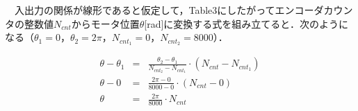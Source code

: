 　入出力の関係が線形であると仮定して，Table3にしたがってエンコーダカウンタの整数値$N_{cnt}$からモータ位置$\theta$[rad]に変換する式を組み立てると．次のようになる（$\theta_1 = 0$，$\theta_2 = 2\pi$，$N_{cnt_1} = 0$，$N_{cnt_2} = 8000$）．

\begin{eqnarray}
    \theta - \theta_1 &=& \frac{\theta_2 - \theta_1}{N_{cnt_2} - N_{cnt_1}} \cdot \left(N_{cnt} - N_{cnt_1} \right) \nonumber \\
    \theta - 0 &=& \frac{2\pi - 0}{8000 - 0} \cdot \left(N_{cnt} - 0 \right) \nonumber \\
    \theta &=& \frac{2\pi}{8000} \cdot N_{cnt}
\end{eqnarray}






